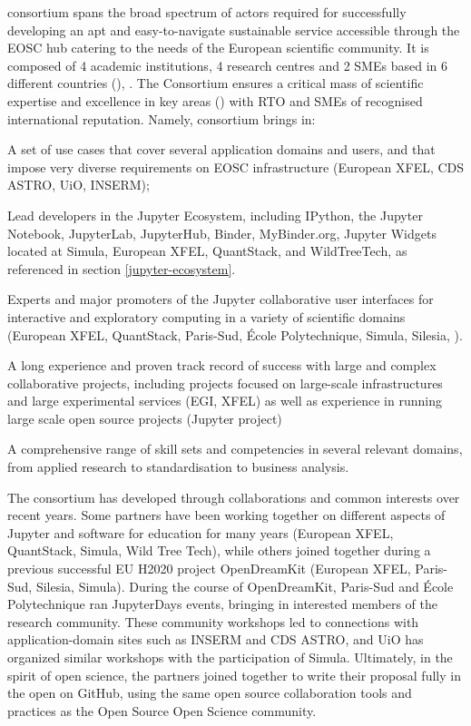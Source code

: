 \TheProject consortium spans the broad spectrum of actors required 
for successfully developing an apt and easy-to-navigate sustainable service 
accessible through the EOSC hub catering to the needs of the European 
scientific community. It is composed of 4 academic institutions, 4 research 
centres and 2 SMEs based in 6 different countries (), . 
The Consortium ensures a critical mass of scientific expertise and excellence 
in key areas () with RTO and SMEs of recognised
 international reputation. Namely, \TheProject consortium brings in:
\begin{compactitem}
\item A set of use cases that cover several application domains and users, and that impose very diverse
requirements on EOSC infrastructure (European XFEL, CDS ASTRO, UiO, INSERM);
\item Lead developers in the Jupyter Ecosystem, including IPython, the Jupyter Notebook, JupyterLab,
JupyterHub, Binder, MyBinder.org, Jupyter Widgets located at Simula, European XFEL, QuantStack, and
WildTreeTech,
as referenced in section \ref{jupyter-ecosystem}.
\item Experts and major promoters of the Jupyter collaborative user interfaces for interactive and exploratory
computing in a variety of scientific domains (European XFEL, QuantStack, Paris-Sud, \'Ecole Polytechnique,
Simula, Silesia, ).
\item A long experience and proven track record of success with large and complex collaborative projects,
including projects focused on large-scale infrastructures and large experimental services (EGI, XFEL) as well
as experience in running large scale open source projects (Jupyter project)
\item A comprehensive range of skill sets and competencies in several relevant domains, from applied
research to standardisation to business
analysis.
\end{compactitem}

The consortium has developed through collaborations and common interests over recent years.
Some partners have been working together on different aspects of Jupyter
and software for education for many years (European XFEL, QuantStack, Simula, Wild Tree Tech),
while others joined together during a previous successful EU H2020 project OpenDreamKit (European XFEL,
Paris-Sud, Silesia, Simula).
During the course of OpenDreamKit, Paris-Sud and \'Ecole Polytechnique
ran JupyterDays events, bringing in interested members of the research community.
These community workshops led to connections with application-domain sites such as INSERM and CDS
ASTRO,
and UiO has organized similar workshops with the participation of Simula.
Ultimately, in the spirit of open science,
the partners joined together to write their proposal fully in the open on GitHub,
using the same open source collaboration tools and practices
as the Open Source Open Science community.

